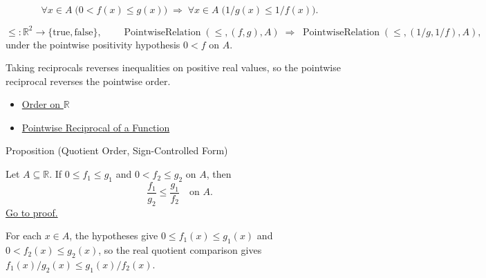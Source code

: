 \begin{remark*}
\[
  \forall x\in A\;\bigl(0<f(x)\leq g(x)\bigr)
  \;\Longrightarrow\;
  \forall x\in A\;\bigl(1/g(x)\leq 1/f(x)\bigr).
\]
\end{remark*}

\begin{remark*}
\[
  \leq\colon \mathbb{R}^2\to\{\mathrm{true},\mathrm{false}\},\qquad
  \operatorname{PointwiseRelation}(\leq,(f,g),A)
  \;\Longrightarrow\;
  \operatorname{PointwiseRelation}(\leq,(1/g,1/f),A),
\]
under the pointwise positivity hypothesis \(0<f\) on \(A\).
\end{remark*}

\begin{remark*}[Interpretation]
Taking reciprocals reverses inequalities on positive real values, so the
pointwise reciprocal reverses the pointwise order.
\end{remark*}

\begin{dependencies}
\begin{itemize}
  \item \hyperref[def:order-on-r]{Order on \(\mathbb{R}\)}
  \item \hyperref[def:pointwise-reciprocal-of-a-function]{Pointwise Reciprocal of a Function}
\end{itemize}
\end{dependencies}

\begin{propositionbox}{Proposition (Quotient Order, Sign-Controlled Form)}
\begin{proposition}
\label{prop:quotient-order-sign-controlled}
Let \(A\subseteq\mathbb{R}\).  If \(0\leq f_1\leq g_1\) and
\(0<f_2\leq g_2\) on \(A\), then
\[
  \frac{f_1}{g_2}\leq \frac{g_1}{f_2}
  \quad\text{on }A.
\]
\hyperref[prf:quotient-order-sign-controlled]{Go to proof.}
\end{proposition}
\end{propositionbox}

\begin{remark*}
For each \(x\in A\), the hypotheses give
\(0\leq f_1(x)\leq g_1(x)\) and \(0<f_2(x)\leq g_2(x)\), so the real
quotient comparison gives \(f_1(x)/g_2(x)\leq g_1(x)/f_2(x)\).
\end{remark*}

